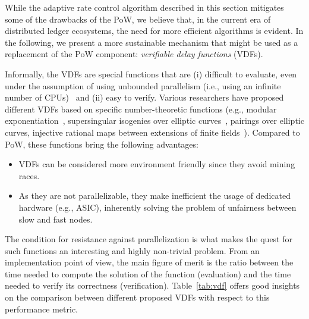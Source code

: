\documentclass[../main.tex]{subfiles}
\begin{document}
While the adaptive rate control algorithm described in this section mitigates some of the drawbacks of the PoW, we believe that, in the current era of distributed ledger ecosystems, the need for more efficient algorithms is evident. In the following, we present a more sustainable mechanism that might be used as a replacement of the PoW component: \textit{verifiable delay functions} (VDFs).

Informally, the VDFs are special functions that are (i) difficult to evaluate, even under the assumption of using unbounded parallelism (i.e., using an infinite number of CPUs)~\cite{borodin1975} and (ii) easy to verify. Various researchers have proposed different VDFs based on specific number-theoretic functions (e.g., modular exponentiation~\cite{dwork1993, pietrzak2018}, supersingular isogenies over elliptic curves~\cite{defeo2019}, pairings over elliptic curves, injective rational maps between extensions of finite fields~\cite{boneh2018}). Compared to PoW, these functions bring the following advantages:
\begin{itemize}
    \item VDFs can be considered more environment friendly since they avoid mining races.
    \item As they are not parallelizable, they make inefficient the usage of dedicated hardware (e.g., ASIC), inherently solving the problem of unfairness between slow and fast nodes.
\end{itemize}
The condition for resistance against parallelization is what makes the quest for such functions an interesting and highly non-trivial problem. From an implementation point of view, the main figure of merit is the ratio between the time needed to compute the solution of the function (evaluation) and the time needed to verify its correctness (verification). Table~\ref{tab:vdf} offers good insights on the comparison between different proposed VDFs with respect to this performance metric.

\end{document}
